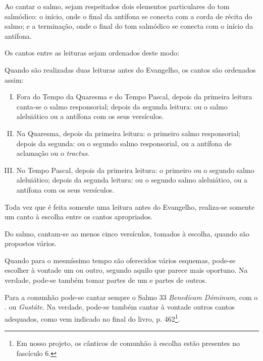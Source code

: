 Ao cantar o salmo, sejam respeitados dois elementos particulares do tom salmódico: o início, onde o final da antífona se conecta com a corda de récita do salmo; e a terminação, onde o final do tom salmódico se conecta com o início da antífona.

 Os cantos entre as leituras sejam ordenados deste modo:

Quando são realizadas duas leituras antes do Evangelho, os cantos são ordenados assim:
\begin{enumerate}[I)]
  \item Fora do Tempo da Quaresma e do Tempo Pascal, depois da primeira leitura canta-se o salmo responsorial; depois da segunda leitura: ou o salmo aleluiático ou a antífona \textcolor{gregoriocolor}{\Al} com os seus versículos.

  \item Na Quaresma, depois da primeira leitura: o primeiro salmo responsorial; depois da segunda: ou o segundo salmo responsorial, ou a antífona de aclamação ou o \emph{tractus}.

  \item No Tempo Pascal, depois da primeira leitura: o primeiro ou o segundo salmo aleluiático; depois da segunda leitura: ou o segundo salmo aleluiático, ou a antífona \textcolor{gregoriocolor}{\Al} com os seus versículos.
\end{enumerate}

Toda vez que é feita somente uma leitura antes do Evangelho, realiza-se somente um canto à escolha entre os cantos apropriados.

Do salmo, cantam-se ao menos cinco versículos, tomados à escolha, quando são propostos vários.

 Quando para o mesmíssimo tempo são oferecidos vários esquemas, pode-se escolher à vontade um ou outro, segundo aquilo que parece mais oportuno. Na verdade, pode-se também tomar partes de um e partes de outros.

Para a comunhão pode-se cantar sempre o Salmo 33 \textcolor{gregoriocolor}{\emph{Benedícam Dóminum}}, com o \Rbar. \textcolor{gregoriocolor}{\Al} ou \textcolor{gregoriocolor}{\emph{Gustáte}}. Na verdade, pode-se também cantar à vontade outros cantos adequados, como vem indicado no final do livro, p. \textcolor{gregoriocolor}{462}\footnote{Em nosso projeto, os cânticos de comunhão à escolha estão presentes no fascículo 6.}.
